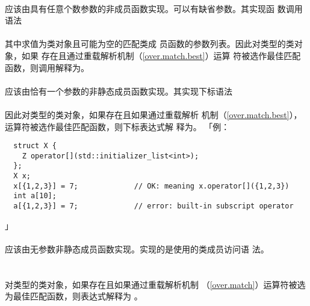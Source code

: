 \paragraph{}
应该由具有任意个数参数的非成员函数实现。可以有缺省参数。其实现函
数调用语法                                                                    \\
\mbox{}                                                                    \\
其中求值为类对象且可能为空的匹配类成
员函数的参数列表。因此对类型的类对象，如果
存在且通过重载解析机制（\ref{over.match.best}）运算
符被选作最佳匹配函数，则调用解释为。

\paragraph{}
应该由恰有一个参数的非静态成员函数实现。其实现下标语法         \\
\mbox{}                                                                   \\
因此对类型的类对象，如果存在且如果通过重载解析
机制（\ref{over.match.best}），运算符被选作最佳匹配函数，则下标表达式解
释为。 「例：
\begin{lstlisting}
  struct X {
    Z operator[](std::initializer_list<int>);
  };
  X x;
  x[{1,2,3}] = 7;             // OK: meaning x.operator[]({1,2,3})
  int a[10];
  a[{1,2,3}] = 7;             // error: built-in subscript operator
\end{lstlisting}」

\paragraph{}
应该由无参数非静态成员函数实现。实现的是使用\tm{->}的类成员访问语
法。                                                                          \\
\mbox{}                                                          \\
\mbox{}    \\
对类型的类对象，如果存在且如果通过重载解析机制
（\ref{over.match}）运算符被选为最佳匹配函数，则表达式解释为
。

